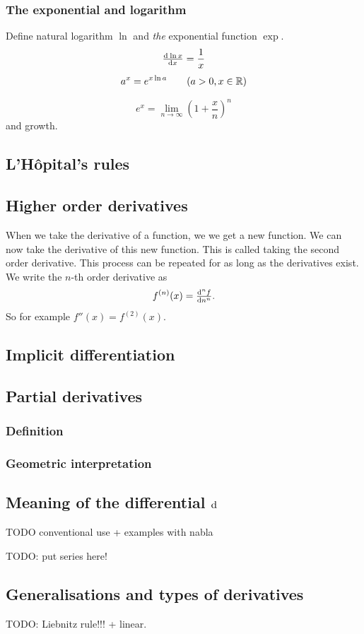 \subsubsection{The exponential and logarithm}
Define natural logarithm $\ln$ and \textit{the} exponential function $\exp$.
\[ \od{\ln x}{x} = \frac{1}{x} \]
\[ a^x = e^{x\ln a} \qquad (a>0, x\in \mathbb{R}) \]

\[ e^x = \lim_{n\to \infty}\left(1+\frac{x}{n}\right)^n \]
and growth.

\subsection{L'Hôpital's rules}


\subsection{Higher order derivatives}
When we take the derivative of a function, we we get a new function. We can now take the derivative of this new function. This is called taking the second order derivative. This process can be repeated for as long as the derivatives exist. We write the $n$-th order derivative as
\[ f^{(n)}(x) = \od[n]{f}{n}. \]
So for example $f''(x) = f^{(2)}(x)$.

\subsection{Implicit differentiation}

\subsection{Partial derivatives}
\subsubsection{Definition}
\subsubsection{Geometric interpretation}

\subsection{Meaning of the differential $\operatorname{d \!}{}$}
TODO conventional use + examples with nabla

TODO: put series here!

\subsection{Generalisations and types of derivatives}
TODO: Liebnitz rule!!! + linear.

